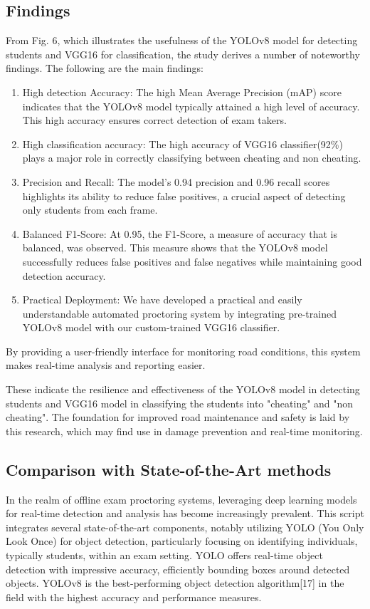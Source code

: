 \documentclass[conference]{IEEEtran}
\begin{document}
\subsection{Findings}
From Fig. 6, which illustrates the usefulness of the YOLOv8
model for detecting students and VGG16 for classification, the study derives a number of noteworthy findings. The following are the main findings:
\begin{enumerate}
    \item  High detection Accuracy: The high Mean Average Precision (mAP) score indicates that the YOLOv8 model typically attained a high level of accuracy. This high accuracy ensures correct detection of exam takers.
    \item High classification accuracy: The high accuracy of VGG16 classifier(92\%) plays a major role in correctly classifying between cheating and non cheating.
     \item Precision and Recall: The model’s 0.94 precision and 0.96 recall scores
highlights its ability to reduce false positives, a crucial
aspect of detecting only students from each frame.
 
    \item Balanced F1-Score: At 0.95, the F1-Score, a measure of
accuracy that is balanced, was observed. This measure
shows that the YOLOv8 model successfully reduces false
positives and false negatives while maintaining good
detection accuracy.
\item Practical Deployment: We have developed a practical and
easily understandable automated proctoring system by integrating pre-trained YOLOv8 model with our custom-trained VGG16 classifier. 


\end{enumerate}


By providing a user-friendly interface for monitoring road
conditions, this system makes real-time analysis and reporting easier.

These indicate the resilience and effectiveness of the YOLOv8
model in detecting students and VGG16 model in classifying the students into "cheating" and "non cheating". The foundation for improved road maintenance and safety is laid by this research,
which may find use in damage prevention and real-time
monitoring.

\subsection{Comparison with State-of-the-Art methods}
In the realm of offline exam proctoring systems, leveraging deep learning models for real-time detection and analysis has become increasingly prevalent. This script integrates several state-of-the-art components, notably utilizing YOLO (You Only Look Once) for object detection, particularly focusing on identifying individuals, typically students, within an exam setting. YOLO offers real-time object detection with impressive accuracy, efficiently bounding boxes around detected objects. YOLOv8 is the best-performing object detection algorithm[17] in the field with the highest accuracy and performance measures.
\end{document}

